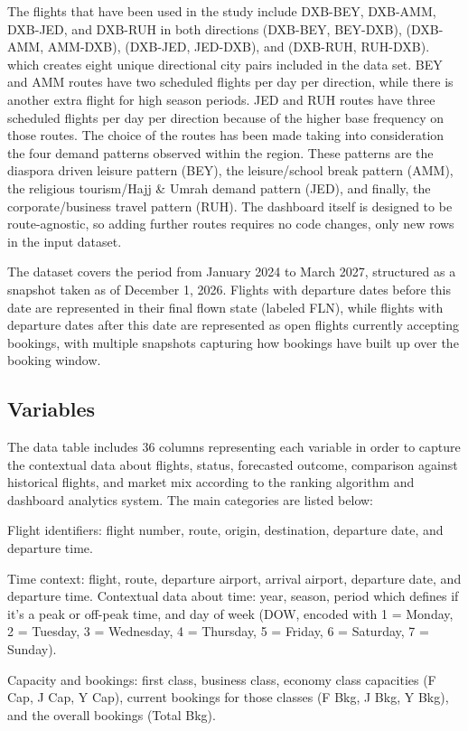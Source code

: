 The flights that have been used in the study include DXB-BEY, DXB-AMM, DXB-JED, and DXB-RUH in both directions (DXB-BEY, BEY-DXB), (DXB-AMM, AMM-DXB), (DXB-JED, JED-DXB), and (DXB-RUH, RUH-DXB). which creates eight unique directional city pairs included in the data set. BEY and AMM routes have two scheduled flights per day per direction, while there is another extra flight for high season periods. JED and RUH routes have three scheduled flights per day per direction because of the higher base frequency on those routes. The choice of the routes has been made taking into consideration the four demand patterns observed within the region. These patterns are the diaspora driven leisure pattern (BEY), the leisure/school break pattern (AMM), the religious tourism/Hajj \& Umrah demand pattern (JED), and finally, the corporate/business travel pattern (RUH). The dashboard itself is designed to be route-agnostic, so adding further routes requires no code changes, only new rows in the input dataset.

The dataset covers the period from January 2024 to March 2027, structured as a snapshot taken as of December 1, 2026. Flights with departure dates before this date are represented in their final flown state (labeled FLN), while flights with departure dates after this date are represented as open flights currently accepting bookings, with multiple snapshots capturing how bookings have built up over the booking window.

\subsection{Variables}

The data table includes 36 columns representing each variable in order to capture the contextual data about flights, status, forecasted outcome, comparison against historical flights, and market mix according to the ranking algorithm and dashboard analytics system. The main categories are listed below:

Flight identifiers: flight number, route, origin, destination, departure date, and departure time.

Time context: flight, route, departure airport, arrival airport, departure date, and departure time. Contextual data about time: year, season, period which defines if it's a peak or off-peak time, and day of week (DOW, encoded with 1 = Monday, 2 = Tuesday, 3 = Wednesday, 4 = Thursday, 5 = Friday, 6 = Saturday, 7 = Sunday).

Capacity and bookings: first class, business class, economy class capacities (F Cap, J Cap, Y Cap), current bookings for those classes (F Bkg, J Bkg, Y Bkg), and the overall bookings (Total Bkg).

